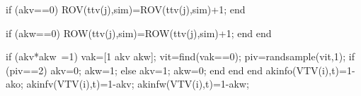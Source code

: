                                                           if (akv==0)
                                                             ROV(ttv(j),sim)=ROV(ttv(j),sim)+1;
                                                          end
                                                          
                                                          if (akw==0)
                                                             ROW(ttv(j),sim)=ROW(ttv(j),sim)+1;
                                                          end
                                                    end  
                                                     
                                                                if (akv*akw~=1)
                                                                       vak=[1 akv akw];
                                                                       vit=find(vak==0); 
                                                                       piv=randsample(vit,1);
                                                                       if (piv==2)
                                                                            akv=0;
                                                                            akw=1;
                                                                       else
                                                                            akv=1;
                                                                            akw=0;
                                                                       end                                                                       
                                                                end                                        
                                          end
                                          akinfo(VTV(i),t)=1-ako;
                                          akinfv(VTV(i),t)=1-akv;
                                          akinfw(VTV(i),t)=1-akw;
                                          
